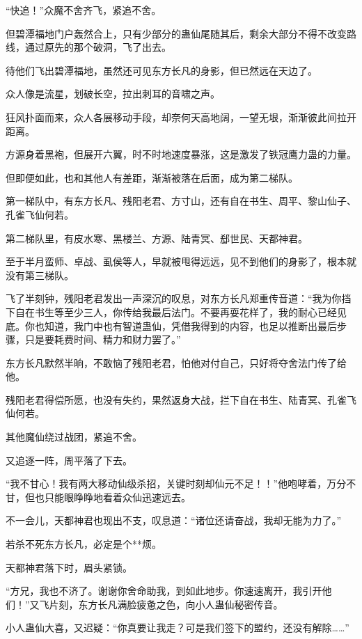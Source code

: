 
\begin{this_body}

“快追！”众魔不舍齐飞，紧追不舍。

但碧潭福地门户轰然合上，只有少部分的蛊仙尾随其后，剩余大部分不得不改变路线，通过原先的那个破洞，飞了出去。

待他们飞出碧潭福地，虽然还可见东方长凡的身影，但已然远在天边了。

众人像是流星，划破长空，拉出刺耳的音啸之声。

狂风扑面而来，众人各展移动手段，却奈何天高地阔，一望无垠，渐渐彼此间拉开距离。

方源身着黑袍，但展开六翼，时不时地速度暴涨，这是激发了铁冠鹰力蛊的力量。

但即便如此，也和其他人有差距，渐渐被落在后面，成为第二梯队。

第一梯队中，有东方长凡、残阳老君、方寸山，还有自在书生、周平、黎山仙子、孔雀飞仙何若。

第二梯队里，有皮水寒、黑楼兰、方源、陆青冥、郄世民、天都神君。

至于半月蛮师、卓战、虱侯等人，早就被甩得远远，见不到他们的身影了，根本就没有第三梯队。

飞了半刻钟，残阳老君发出一声深沉的叹息，对东方长凡郑重传音道：“我为你挡下自在书生等至少三人，你传给我最后法门。不要再耍花样了，我的耐心已经见底。你也知道，我门中也有智道蛊仙，凭借我得到的内容，也足以推断出最后步骤，只是要耗费时间、精力和财力罢了。”

东方长凡默然半晌，不敢恼了残阳老君，怕他对付自己，只好将夺舍法门传了给他。

残阳老君得偿所愿，也没有失约，果然返身大战，拦下自在书生、陆青冥、孔雀飞仙何若。

其他魔仙绕过战团，紧追不舍。

又追逐一阵，周平落了下去。

“我不甘心！我有两大移动仙级杀招，关键时刻却仙元不足！！”他咆哮着，万分不甘，但也只能眼睁睁地看着众仙迅速远去。

不一会儿，天都神君也现出不支，叹息道：“诸位还请奋战，我却无能为力了。”

若杀不死东方长凡，必定是个**烦。

天都神君落下时，眉头紧锁。

“方兄，我也不济了。谢谢你舍命助我，到如此地步。你速速离开，我引开他们！”又飞片刻，东方长凡满脸疲惫之色，向小人蛊仙秘密传音。

小人蛊仙大喜，又迟疑：“你真要让我走？可是我们签下的盟约，还没有解除……”


\end{this_body}
